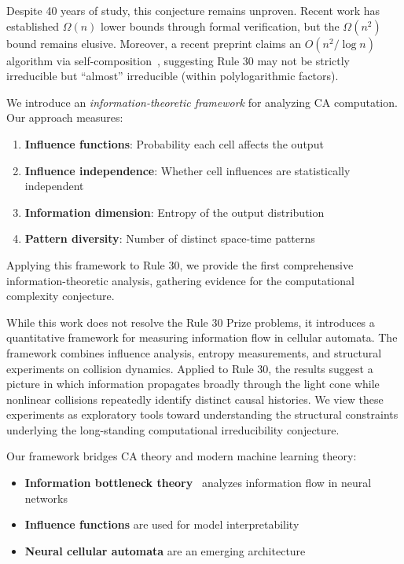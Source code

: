 \documentclass[11pt]{article}
\begin{document}
Despite 40 years of study, this conjecture remains unproven. Recent work has established $\Omega(n)$ lower bounds through formal verification, but the $\Omega(n^2)$ bound remains elusive. Moreover, a recent preprint claims an $O(n^2 / \log n)$ algorithm via self-composition~\citep{natal_2024}, suggesting Rule 30 may not be strictly irreducible but ``almost'' irreducible (within polylogarithmic factors).

We introduce an \emph{information-theoretic framework} for analyzing CA computation. Our approach measures:
\begin{enumerate}
    \item \textbf{Influence functions}: Probability each cell affects the output
    \item \textbf{Influence independence}: Whether cell influences are statistically independent
    \item \textbf{Information dimension}: Entropy of the output distribution
    \item \textbf{Pattern diversity}: Number of distinct space-time patterns
\end{enumerate}

Applying this framework to Rule 30, we provide the first comprehensive information-theoretic analysis, gathering evidence for the computational complexity conjecture.

While this work does not resolve the Rule 30 Prize problems, it introduces a quantitative framework for measuring information flow in cellular automata. The framework combines influence analysis, entropy measurements, and structural experiments on collision dynamics. Applied to Rule 30, the results suggest a picture in which information propagates broadly through the light cone while nonlinear collisions repeatedly identify distinct causal histories. We view these experiments as exploratory tools toward understanding the structural constraints underlying the long-standing computational irreducibility conjecture.

Our framework bridges CA theory and modern machine learning theory:
\begin{itemize}
    \item \textbf{Information bottleneck theory}~\citep{tishby_2015} analyzes information flow in neural networks
    \item \textbf{Influence functions} are used for model interpretability~\citep{koh_2017}
    \item \textbf{Neural cellular automata} are an emerging architecture~\citep{mordvintsev_2020}
\end{itemize}
\end{document}
